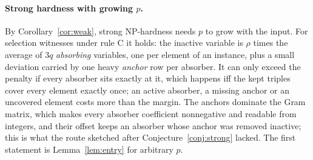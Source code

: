 %


\paragraph{Strong hardness with growing $p$.} By Corollary~\ref{cor:weak}, strong NP-hardness needs $p$ to grow with the input. For selection witnesses under rule C it holds: the inactive variable is $\rho$ times the average of $3q$ \emph{absorbing} variables, one per element of an  instance, plus a small deviation carried by one heavy \emph{anchor} row per absorber. It can only exceed the penalty if every absorber sits exactly at it, which happens iff the kept triples cover every element exactly once; an active absorber, a missing anchor or an uncovered element costs more than the margin. The anchors dominate the Gram matrix, which makes every absorber coefficient nonnegative and readable from integers, and their offset keeps an absorber whose anchor was removed inactive; this is what the route sketched after Conjecture~\ref{conj:strong} lacked. The first statement is Lemma~\ref{lem:entry} for arbitrary $p$.

